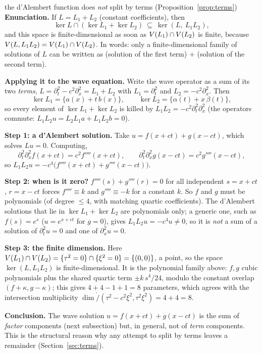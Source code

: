 \begin{explained}{the d'Alembert function does \emph{not} split by terms (Proposition~\ref{prop:terms})}
\textbf{Enunciation.} If $L=L_1+L_2$ (constant coefficients), then
\[
\ker L\cap(\ker L_1+\ker L_2)\ \subseteq\ \ker(L,\ L_1L_2),
\]
and this space is finite-dimensional as soon as $V(L_1)\cap V(L_2)$ is finite, because $V(L,L_1L_2)=V(L_1)\cap V(L_2)$. In words: only a finite-dimensional family of solutions of $L$ can be written as (solution of the first term) $+$ (solution of the second term).

\medskip\textbf{Applying it to the wave equation.} Write the wave operator as a sum of its two \emph{terms}, $L=\partial_t^2-c^2\partial_x^2=L_1+L_2$ with $L_1=\partial_t^2$ and $L_2=-c^2\partial_x^2$. Then
\[
\ker L_1=\{a(x)+t\,b(x)\},\qquad \ker L_2=\{\alpha(t)+x\,\beta(t)\},
\]
so every element of $\ker L_1+\ker L_2$ is killed by $L_1L_2=-c^2\partial_t^2\partial_x^2$ (the operators commute: $L_1L_2u=L_2L_1a+L_1L_2b=0$).

\medskip\textbf{Step 1: a d'Alembert solution.} Take $u=f(x+ct)+g(x-ct)$, which solves $Lu=0$. Computing,
\[
\partial_t^2\partial_x^2f(x+ct)=c^2f''''(x+ct),\qquad \partial_t^2\partial_x^2g(x-ct)=c^2g''''(x-ct),
\]
so $L_1L_2u=-c^4\big(f''''(x+ct)+g''''(x-ct)\big)$.

\medskip\textbf{Step 2: when is it zero?} $f''''(s)+g''''(r)=0$ for all independent $s=x+ct$, $r=x-ct$ forces $f''''\equiv k$ and $g''''\equiv-k$ for a constant $k$. So $f$ and $g$ must be polynomials (of degree $\le4$, with matching quartic coefficients). The d'Alembert solutions that lie in $\ker L_1+\ker L_2$ are polynomials only; a generic one, such as $f(s)=e^s$ ($u=e^{x+ct}$ for $g=0$), gives $L_1L_2u=-c^4u\ne0$, so it is \emph{not} a sum of a solution of $\partial_t^2u=0$ and one of $\partial_x^2u=0$.

\medskip\textbf{Step 3: the finite dimension.} Here $V(L_1)\cap V(L_2)=\{\tau^2=0\}\cap\{\xi^2=0\}=\{(0,0)\}$, a point, so the space $\ker(L,L_1L_2)$ is finite-dimensional. It is the polynomial family above: $f,g$ cubic polynomials plus the shared quartic term $\pm k\,s^4/24$, modulo the constant overlap $(f+\kappa,g-\kappa)$; this gives $4+4-1+1=8$ parameters, which agrees with the intersection multiplicity $\dim\ring/(\tau^2-c^2\xi^2,\tau^2\xi^2)=4+4=8$.

\medskip\textbf{Conclusion.} The wave solution $u=f(x+ct)+g(x-ct)$ is the sum of \emph{factor} components (next subsection) but, in general, not of \emph{term} components. This is the structural reason why any attempt to split by terms leaves a remainder (Section~\ref{sec:terms}).
\end{explained}


